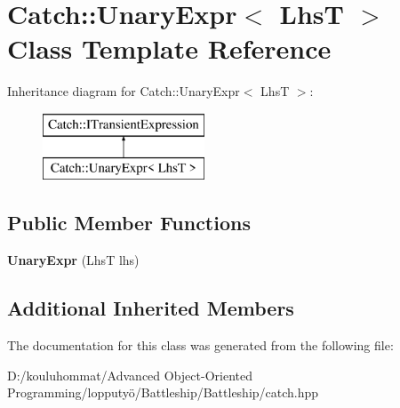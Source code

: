 \hypertarget{class_catch_1_1_unary_expr}{}\section{Catch\+:\+:Unary\+Expr$<$ LhsT $>$ Class Template Reference}
\label{class_catch_1_1_unary_expr}
Inheritance diagram for Catch\+:\+:Unary\+Expr$<$ LhsT $>$\+:\begin{figure}[H]
\begin{center}
\leavevmode
\includegraphics[height=2.000000cm]{class_catch_1_1_unary_expr}
\end{center}
\end{figure}
\subsection*{Public Member Functions}
\begin{DoxyCompactItemize}
\item 
\mbox{\label{class_catch_1_1_unary_expr_ae02f666a1e64da728628aa2033e1d6e7}} 
{\bfseries Unary\+Expr} (LhsT lhs)
\end{DoxyCompactItemize}
\subsection*{Additional Inherited Members}


The documentation for this class was generated from the following file\+:\begin{DoxyCompactItemize}
\item 
D\+:/kouluhommat/\+Advanced Object-\/\+Oriented Programming/lopputyö/\+Battleship/\+Battleship/catch.\+hpp\end{DoxyCompactItemize}
